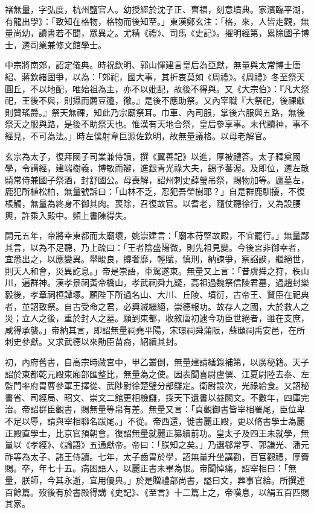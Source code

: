 
\begin{pinyinscope}

 褚無量，字弘度，杭州鹽官人。幼授經於沈子正、曹福，刻意墳典。家濱臨平湖，有龍出學》：「致知在格物，格物而後知至。」東漢鄭玄注：「格，來，人皆走觀，無量尚幼，讀書若不聞，眾異之。尤精《禮》、司馬《史記》。擢明經第，累除國子博士，遷司業兼修文館學士。



 中宗將南郊，詔定儀典。時祝欽明、郭山惲建言皇后為亞獻，無量與太常博士唐紹、蔣欽緒固爭，以為：「郊祀，國大事，其折衷莫如《周禮》。《周禮》冬至祭天圓丘，不以地配，唯始祖為主，亦不以妣配，故後不得與。又《大宗伯》：『凡大祭祀，王後不與，則攝而薦豆籩，徹。』是後不應助祭。又內宰職『大祭祀，後祼獻則贊瑤爵。』祭天無祼，知此乃宗廟祭耳。巾車、內司服，掌後六服與五路，無後祭天之服與路，是後不助祭天也。惟漢有天地合祭，皇后參享事。末代黷神，事不經見，不可為法。」時左僕射韋巨源佐欽明，故無量議格。以母老解官。



 玄宗為太子，復拜國子司業兼侍讀，撰《翼善記》以進，厚被禮答。太子釋奠國學，令講經，建端樹義，博敏而辯，進銀青光祿大夫，錫予蕃渥。及即位，遷左散騎常侍兼國子祭酒，封舒國公。母喪解，詔州刺史薛瑩吊祭，賜物加等。廬墓左，鹿犯所植松柏，無量號訴曰：「山林不乏，忍犯吾塋樹耶？」自是群鹿馴擾，不復棖觸，無量為終身不御其肉。喪除，召復故官。以耆老，隨仗聽徐行，又為設腰輿，許乘入殿中。頻上書陳得失。



 開元五年，帝將幸東都而太廟壞，姚崇建言：「廟本苻堅故殿，不宜罷行。」無量鄙其言，以為不足聽，乃上疏曰：「王者陰盛陽微，則先祖見變。今後宮非御幸者，宜悉出之，以應變異。舉畯良，撙奢靡，輕賦，慎刑，納諫爭，察諂諛，繼絕世，則天人和會，災異訖息。」帝是崇語，車駕遂東。無量又上言：「昔虞舜之狩，秩山川，遍群神。漢孝景祠黃帝橋山，孝武祠舜九疑，高祖過魏祭信陵君墓，過趙封樂毅後，孝章祠桓譚塚。願陛下所過名山、大川、丘陵、墳衍，古帝王、賢臣在祀典者，並詔致祭。自古受命之君，必興滅繼絕，崇德報功。故存人之國，大於救人之災；立人之後，重於封人之墓。願到東都，收敘唐初逮今功臣世絕者，雖在支庶，咸得承襲。」帝納其言，即詔無量祠堯平陽，宋璟祠舜蒲阪，蘇頲祠禹安邑，在所刺史參獻。又求武德以來勛臣苗裔，紹續其封。



 初，內府舊書，自高宗時藏宮中，甲乙叢倒，無量建請繕錄補第，以廣秘籍。天子詔於東都乾元殿東廂部匯整比，無量為之使。因表聞喜尉盧僎、江夏尉陸去泰、左監門率府胄曹參軍王擇從、武陟尉徐楚璧分部讎定。衛尉設次，光祿給食。又詔秘書省、司經局、昭文、崇文二館更相檢讎，採天下遺書以益闕文。不數年，四庫完治。帝詔群臣觀書，賜無量等帛有差。無量又言：「貞觀御書皆宰相署尾，臣位卑不足以辱，請與宰相聯名跋尾。」不從。帝西還，徙書麗正殿，更以脩書學士為麗正殿直學士，比京官預朝會。復詔無量就麗正纂續前功。皇太子及四王未就學，無量以《孝經》、《論語》五通獻帝。帝曰：「朕知之矣。」乃選郗常亨、郭謙光、潘元祚等為太子、諸王侍讀。七年，太子齒胄於學，詔無量升坐講勸，百官觀禮，厚賚賜。卒，年七十五。病困語人，以麗正書未畢為恨。帝聞悼痛，詔宰相曰：「無量，朕師，今其永逝，宜用優典。」於是贈禮部尚書，謚曰文，葬事官給。所撰述百餘篇。歿後有於書殿得講《史記》、《至言》十二篇上之，帝嘆息，以絹五百匹賜其家。




\end{pinyinscope}
